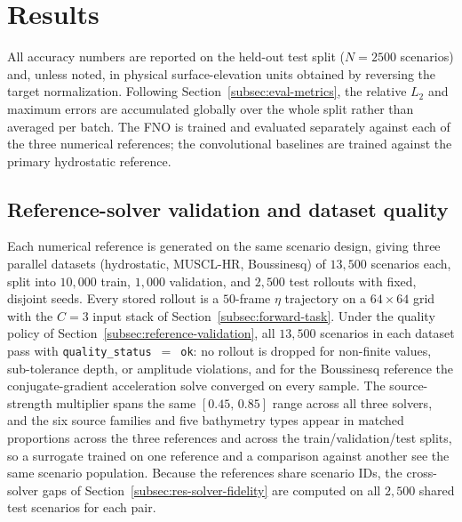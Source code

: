 \section{Results}
\label{sec:results}

All accuracy numbers are reported on the held-out test split ($N = 2500$ scenarios) and, unless noted, in physical surface-elevation units obtained by reversing the target normalization. Following Section~\ref{subsec:eval-metrics}, the relative $L_2$ and maximum errors are accumulated globally over the whole split rather than averaged per batch. The FNO is trained and evaluated separately against each of the three numerical references; the convolutional baselines are trained against the primary hydrostatic reference.

\subsection{Reference-solver validation and dataset quality}
\label{subsec:res-dataset}
Each numerical reference is generated on the same scenario design, giving three parallel datasets (hydrostatic, MUSCL-HR, Boussinesq) of $13{,}500$ scenarios each, split into $10{,}000$ train, $1{,}000$ validation, and $2{,}500$ test rollouts with fixed, disjoint seeds. Every stored rollout is a $50$-frame $\eta$ trajectory on a $64\times64$ grid with the $C=3$ input stack of Section~\ref{subsec:forward-task}. Under the quality policy of Section~\ref{subsec:reference-validation}, all $13{,}500$ scenarios in each dataset pass with \texttt{quality\_status}~$=$~\texttt{ok}: no rollout is dropped for non-finite values, sub-tolerance depth, or amplitude violations, and for the Boussinesq reference the conjugate-gradient acceleration solve converged on every sample. The source-strength multiplier spans the same $[0.45,\, 0.85]$ range across all three solvers, and the six source families and five bathymetry types appear in matched proportions across the three references and across the train/validation/test splits, so a surrogate trained on one reference and a comparison against another see the same scenario population. Because the references share scenario IDs, the cross-solver gaps of Section~\ref{subsec:res-solver-fidelity} are computed on all $2{,}500$ shared test scenarios for each pair.

